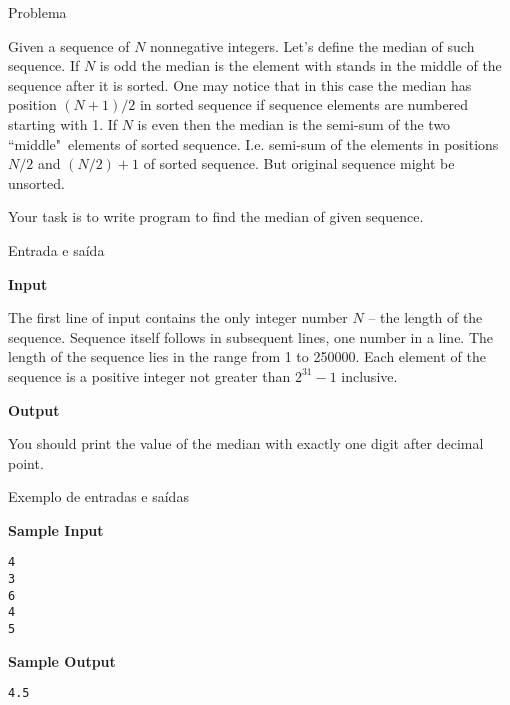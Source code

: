 
\begin{frame}[fragile]{Problema}

Given a sequence of $N$ nonnegative integers. Let's define the median of such sequence. 
If $N$ is odd the median is the element with stands in the middle of the sequence after it is 
sorted. One may notice that in this case the median has position $(N+1)/2$ in sorted sequence if 
sequence elements are numbered starting with 1. If $N$ is even then the median is the semi-sum of 
the two ``middle"\ elements of sorted sequence. I.e. semi-sum of the elements in positions 
$N/2$ and $(N/2)+1$ of sorted sequence. But original sequence might be unsorted.

Your task is to write program to find the median of given sequence.

\end{frame}

\begin{frame}[fragile]{Entrada e saída}

\textbf{Input}

The first line of input contains the only integer number $N$ -- the length of the sequence. 
Sequence itself follows in subsequent lines, one number in a line. The length of the sequence lies 
in the range from 1 to 250000. Each element of the sequence is a positive integer not greater than 
$2^{31}-1$ inclusive.

\textbf{Output}

You should print the value of the median with exactly one digit after decimal point.

\end{frame}

\begin{frame}[fragile]{Exemplo de entradas e saídas}

\begin{minipage}[t]{0.5\textwidth}
\textbf{Sample Input}
\begin{verbatim}
4
3
6
4
5
\end{verbatim}
\end{minipage}
\begin{minipage}[t]{0.45\textwidth}
\textbf{Sample Output}
\begin{verbatim}
4.5
\end{verbatim}
\end{minipage}
\end{frame}

